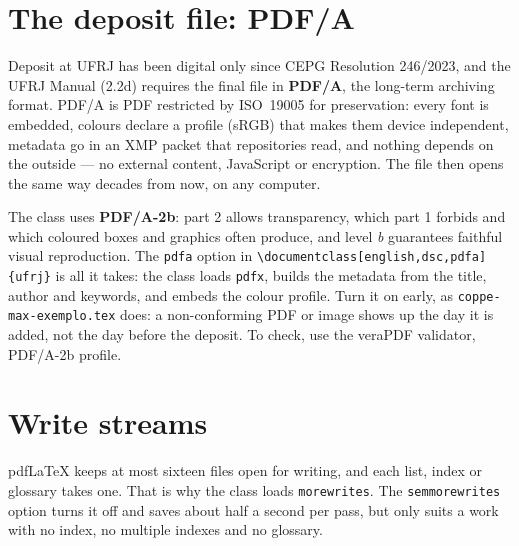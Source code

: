 \documentclass[english,dsc]{ufrj}
\begin{document}
  \section{The deposit file: PDF/A}
  Deposit at UFRJ has been digital only since CEPG Resolution 246/2023, and the
  UFRJ Manual (2.2d) requires the final file in \textbf{PDF/A}, the long-term
  archiving format. PDF/A is PDF restricted by ISO~19005 for preservation: every
  font is embedded, colours declare a profile (sRGB) that makes them device
  independent, metadata go in an XMP packet that repositories read, and nothing
  depends on the outside --- no external content, JavaScript or encryption. The
  file then opens the same way decades from now, on any computer.

  The class uses \textbf{PDF/A-2b}: part 2 allows transparency, which part 1
  forbids and which coloured boxes and graphics often produce, and level
  \emph{b} guarantees faithful visual reproduction. The \texttt{pdfa} option in
  \verb|\documentclass[english,dsc,pdfa]{ufrj}| is all it takes: the class
  loads \texttt{pdfx}, builds the metadata from the title, author and keywords,
  and embeds the colour profile. Turn it on early, as \texttt{coppe-max-exemplo.tex}
  does: a non-conforming PDF or image shows up the day it is added, not the day
  before the deposit. To check, use the veraPDF validator, PDF/A-2b profile.

  \section{Write streams}
  pdf\LaTeX{} keeps at most sixteen files open for writing, and each list,
  index or glossary takes one. That is why the class loads
  \texttt{morewrites}. The \texttt{semmorewrites} option turns it off and saves
  about half a second per pass, but only suits a work with no index, no
  multiple indexes and no glossary.
\end{document}
